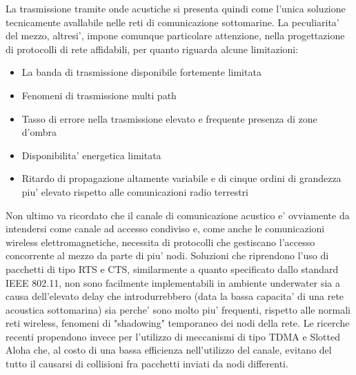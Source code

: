 La trasmissione tramite onde acustiche si presenta quindi come l'unica soluzione tecnicamente avallabile nelle reti di comunicazione sottomarine. La peculiarita' del mezzo, altresi', impone comunque particolare attenzione, nella progettazione di protocolli di rete affidabili, per quanto riguarda alcune limitazioni:
\begin{itemize}

\item La banda di trasmissione disponibile fortemente limitata

\item Fenomeni di trasmissione multi path

\item Tasso di errore nella trasmissione elevato e frequente presenza di zone d'ombra

\item Disponibilita' energetica limitata

\item Ritardo di propagazione altamente variabile e di cinque ordini di grandezza piu' elevato rispetto alle comunicazioni radio terrestri
\end{itemize}

Non ultimo va ricordato che il canale di comunicazione acustico e' ovviamente da intendersi come canale ad accesso condiviso e, come anche le comunicazioni wireless elettromagnetiche, necessita di protocolli che gestiscano l'accesso concorrente al mezzo da parte di piu' nodi. Soluzioni che riprendono l'uso di pacchetti di tipo RTS e CTS, similarmente a quanto specificato dallo standard IEEE 802.11, non sono facilmente implementabili in ambiente underwater sia a causa dell'elevato delay che introdurrebbero (data la bassa capacita' di una rete acoustica sottomarina) sia perche' sono molto piu' frequenti, rispetto alle normali reti wireless, fenomeni di "shadowing" temporaneo dei nodi della rete. Le ricerche recenti propendono invece per l'utilizzo di meccanismi di tipo TDMA e Slotted Aloha che, al costo di una bassa efficienza nell'utilizzo del canale, evitano del tutto il causarsi di collisioni fra pacchetti inviati da nodi differenti.

